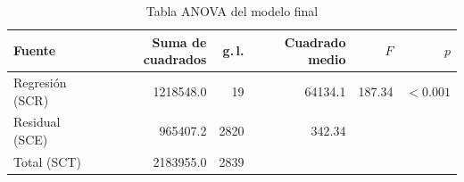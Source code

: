 \begin{table}[htbp]
\centering
\small
\caption{Tabla ANOVA del modelo final}\label{tab:anova}
\begin{tabular}{l r r r r r}
\toprule
Fuente & Suma de cuadrados & g.\,l. & Cuadrado medio & $F$ & $p$ \\
\midrule
Regresión (SCR) & \num{1218548.0} & 19 & \num{64134.1} & \num{187.34} & $<\num{0.001}$ \\
Residual (SCE) & \num{965407.2} & \num{2820} & \num{342.34} & & \\
Total (SCT) & \num{2183955.0} & \num{2839} & & & \\
\bottomrule
\end{tabular}
\par{}
\end{table}
